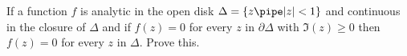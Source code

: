 If a function $f$ is analytic in the open disk $\Delta=\{z \pipe |z|<1\}$
and continuous in the closure of $\Delta$ and if $f(z)=0$ for every
$z$ in $\partial \Delta$ with $\Im(z)\geq 0$ then $f(z)=0$ for every
$z$ in $\Delta$. Prove this.
